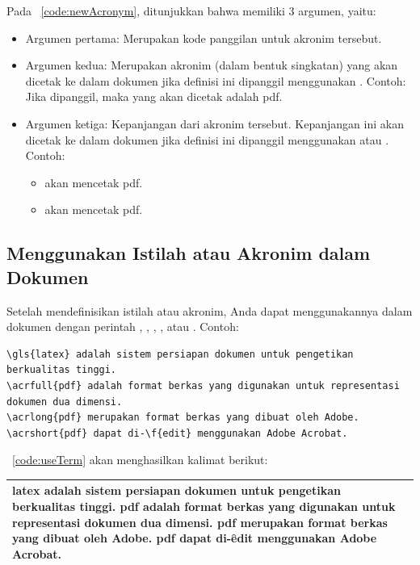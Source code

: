Pada \lst~\ref{code:newAcronym}, ditunjukkan bahwa  memiliki 3 argumen, yaitu:
\begin{itemize}
	\item Argumen pertama: Merupakan kode panggilan untuk akronim tersebut.
	\item Argumen kedua:
		Merupakan akronim (dalam bentuk singkatan) yang akan dicetak ke dalam dokumen jika definisi ini dipanggil menggunakan .
		Contoh: Jika  dipanggil, maka yang akan dicetak adalah \acrshort{pdf}.
	\item Argumen ketiga:
		Kepanjangan dari akronim tersebut.
		Kepanjangan ini akan dicetak ke dalam dokumen jika definisi ini dipanggil menggunakan  atau .
		Contoh:
		\begin{itemize}
			\item {} akan mencetak \acrlong{pdf}.
			\item {} akan mencetak \acrfull{pdf}.
		\end{itemize}
\end{itemize}

\subsection{Menggunakan Istilah atau Akronim dalam Dokumen}
Setelah mendefinisikan istilah atau akronim, Anda dapat menggunakannya dalam dokumen dengan perintah , , , , atau . Contoh:

\begin{lstlisting}[language={[latex]tex}, caption=Contoh penggunaan istilah atau akronim dalam dokumen, label=code:useTerm]
\gls{latex} adalah sistem persiapan dokumen untuk pengetikan berkualitas tinggi.
\acrfull{pdf} adalah format berkas yang digunakan untuk representasi dokumen dua dimensi.
\acrlong{pdf} merupakan format berkas yang dibuat oleh Adobe.
\acrshort{pdf} dapat di-\f{edit} menggunakan Adobe Acrobat.
\end{lstlisting}

\lst~\ref{code:useTerm} akan menghasilkan kalimat berikut:

\begin{tabular}{| p{\linewidth} |}
	\hline
	\gls{latex} adalah sistem persiapan dokumen untuk pengetikan berkualitas tinggi.
	\acrfull{pdf} adalah format berkas yang digunakan untuk representasi dokumen dua dimensi.
	\acrlong{pdf} merupakan format berkas yang dibuat oleh Adobe.
	\acrshort{pdf} dapat di-\f{edit} menggunakan Adobe Acrobat. \\
	\hline
\end{tabular}
\vspace{0.2cm}


